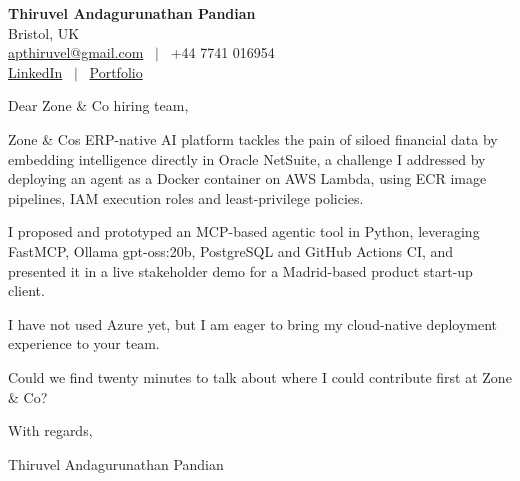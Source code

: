 \documentclass[11pt,a4paper]{article}
\begin{document}
\raggedright
\pagestyle{empty}

\begin{center}
    {\LARGE \color{linkblue} \textbf{Thiruvel Andagurunathan Pandian}}\\[0.2cm]
    Bristol, UK \\
    \href{mailto:apthiruvel@gmail.com}{apthiruvel@gmail.com} \ $|$ \ +44 7741 016954 \\
\href{https://www.linkedin.com/in/thiruvel-a-p/}{LinkedIn} \ $|$ \ \href{https://thiruvel-ap.github.io/PersonalPortfolio/}{Portfolio}
\end{center}

\vspace{0.4cm}

\noindent
Dear Zone \& Co hiring team,

Zone \& Co\textquotesingle{}s ERP-native AI platform tackles the pain of siloed financial data by embedding intelligence directly in Oracle NetSuite, a challenge I addressed by deploying an agent as a Docker container on AWS Lambda, using ECR image pipelines, IAM execution roles and least-privilege policies.

I proposed and prototyped an MCP-based agentic tool in Python, leveraging FastMCP, Ollama gpt-oss:20b, PostgreSQL and GitHub Actions CI, and presented it in a live stakeholder demo for a Madrid-based product start-up client.

I have not used Azure yet, but I am eager to bring my cloud-native deployment experience to your team.

Could we find twenty minutes to talk about where I could contribute first at Zone \& Co?

\vspace{0.5cm}

With regards,

Thiruvel Andagurunathan Pandian
\end{document}
